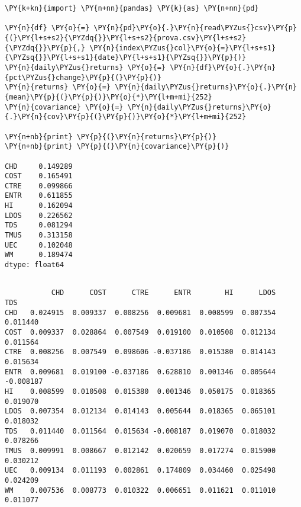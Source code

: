 \begin{Answer}
\begin{tcolorbox}[size=fbox, boxrule=1pt, colback=cellbackground, colframe=cellborder]
\begin{Verbatim}[commandchars=\\\{\}]
\PY{k+kn}{import} \PY{n+nn}{pandas} \PY{k}{as} \PY{n+nn}{pd}
		
\PY{n}{df} \PY{o}{=} \PY{n}{pd}\PY{o}{.}\PY{n}{read\PYZus{}csv}\PY{p}{(}\PY{l+s+s2}{\PYZdq{}}\PY{l+s+s2}{prova.csv}\PY{l+s+s2}{\PYZdq{}}\PY{p}{,} \PY{n}{index\PYZus{}col}\PY{o}{=}\PY{l+s+s1}{\PYZsq{}}\PY{l+s+s1}{date}\PY{l+s+s1}{\PYZsq{}}\PY{p}{)}
\PY{n}{daily\PYZus{}returns} \PY{o}{=} \PY{n}{df}\PY{o}{.}\PY{n}{pct\PYZus{}change}\PY{p}{(}\PY{p}{)}
\PY{n}{returns} \PY{o}{=} \PY{n}{daily\PYZus{}returns}\PY{o}{.}\PY{n}{mean}\PY{p}{(}\PY{p}{)}\PY{o}{*}\PY{l+m+mi}{252}
\PY{n}{covariance} \PY{o}{=} \PY{n}{daily\PYZus{}returns}\PY{o}{.}\PY{n}{cov}\PY{p}{(}\PY{p}{)}\PY{o}{*}\PY{l+m+mi}{252}

\PY{n+nb}{print} \PY{p}{(}\PY{n}{returns}\PY{p}{)}
\PY{n+nb}{print} \PY{p}{(}\PY{n}{covariance}\PY{p}{)}

CHD     0.149289
COST    0.165491
CTRE    0.099866
ENTR    0.611855
HI      0.162094
LDOS    0.226562
TDS     0.081294
TMUS    0.313158
UEC     0.102048
WM      0.189474
dtype: float64
\end{Verbatim}
\end{tcolorbox}

\begin{tcolorbox}[size=fbox, boxrule=1pt, colback=cellbackground, colframe=cellborder]
\begin{Verbatim}[commandchars=\\\{\}]

           CHD      COST      CTRE      ENTR        HI      LDOS       TDS
CHD   0.024915  0.009337  0.008256  0.009681  0.008599  0.007354  0.011440
COST  0.009337  0.028864  0.007549  0.019100  0.010508  0.012134  0.011564
CTRE  0.008256  0.007549  0.098606 -0.037186  0.015380  0.014143  0.015634
ENTR  0.009681  0.019100 -0.037186  0.628810  0.001346  0.005644 -0.008187
HI    0.008599  0.010508  0.015380  0.001346  0.050175  0.018365  0.019070
LDOS  0.007354  0.012134  0.014143  0.005644  0.018365  0.065101  0.018032
TDS   0.011440  0.011564  0.015634 -0.008187  0.019070  0.018032  0.078266
TMUS  0.009991  0.008667  0.012142  0.020659  0.017274  0.015900  0.030212
UEC   0.009134  0.011193  0.002861  0.174809  0.034460  0.025498  0.024209
WM    0.007536  0.008773  0.010322  0.006651  0.011621  0.011010  0.011077
	

\end{Verbatim}
\end{tcolorbox}
\end{Answer}

